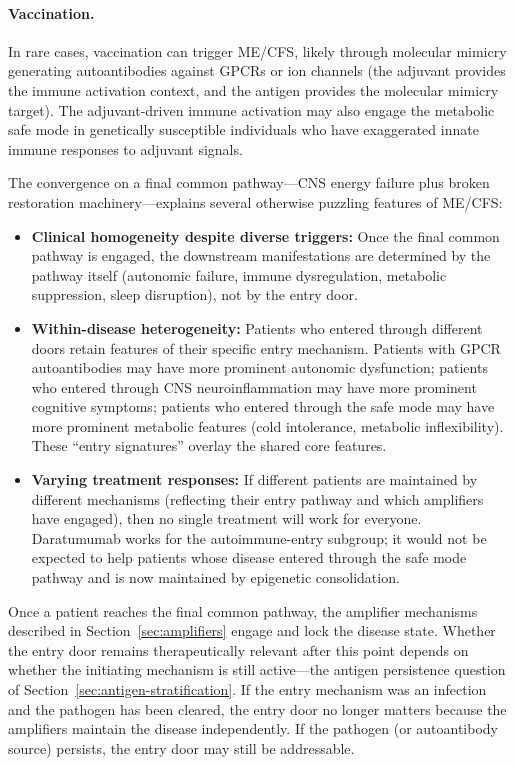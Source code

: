 \paragraph{Vaccination.} In rare cases, vaccination can trigger ME/CFS, likely through molecular mimicry generating autoantibodies against GPCRs or ion channels (the adjuvant provides the immune activation context, and the antigen provides the molecular mimicry target). The adjuvant-driven immune activation may also engage the metabolic safe mode in genetically susceptible individuals who have exaggerated innate immune responses to adjuvant signals.

The convergence on a final common pathway---CNS energy failure plus broken restoration machinery---explains several otherwise puzzling features of ME/CFS:

\begin{itemize}
    \item \textbf{Clinical homogeneity despite diverse triggers:} Once the final common pathway is engaged, the downstream manifestations are determined by the pathway itself (autonomic failure, immune dysregulation, metabolic suppression, sleep disruption), not by the entry door.

    \item \textbf{Within-disease heterogeneity:} Patients who entered through different doors retain features of their specific entry mechanism. Patients with GPCR autoantibodies may have more prominent autonomic dysfunction; patients who entered through CNS neuroinflammation may have more prominent cognitive symptoms; patients who entered through the safe mode may have more prominent metabolic features (cold intolerance, metabolic inflexibility). These ``entry signatures'' overlay the shared core features.

    \item \textbf{Varying treatment responses:} If different patients are maintained by different mechanisms (reflecting their entry pathway and which amplifiers have engaged), then no single treatment will work for everyone. Daratumumab works for the autoimmune-entry subgroup; it would not be expected to help patients whose disease entered through the safe mode pathway and is now maintained by epigenetic consolidation.
\end{itemize}

Once a patient reaches the final common pathway, the amplifier mechanisms described in Section~\ref{sec:amplifiers} engage and lock the disease state. Whether the entry door remains therapeutically relevant after this point depends on whether the initiating mechanism is still active---the antigen persistence question of Section~\ref{sec:antigen-stratification}. If the entry mechanism was an infection and the pathogen has been cleared, the entry door no longer matters because the amplifiers maintain the disease independently. If the pathogen (or autoantibody source) persists, the entry door may still be addressable.

